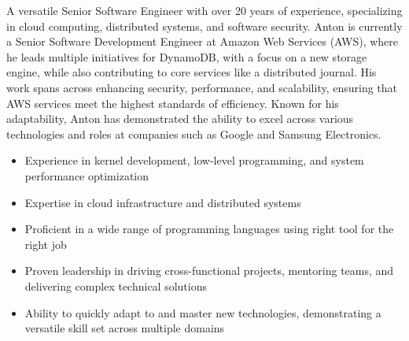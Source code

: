 



A versatile Senior Software Engineer with over 20 years of experience, specializing in cloud computing, distributed systems, and software security. Anton is currently a Senior Software Development Engineer at Amazon Web Services (AWS), where he leads multiple initiatives for DynamoDB, with a focus on a new storage engine, while also contributing to core services like a distributed journal. His work spans across enhancing security, performance, and scalability, ensuring that AWS services meet the highest standards of efficiency. Known for his adaptability, Anton has demonstrated the ability to excel across various technologies and roles at companies such as Google and Samsung Electronics.

\begin{cvparagraph}
\begin{itemize}
  \item Experience in kernel development, low-level programming, and system performance optimization
  \item Expertise in cloud infrastructure and distributed systems
  \item Proficient in a wide range of programming languages using right tool for the right job
  \item Proven leadership in driving cross-functional projects, mentoring teams, and delivering complex technical solutions
  \item Ability to quickly adapt to and master new technologies, demonstrating a versatile skill set across multiple domains
\end{itemize}

\end{cvparagraph}
